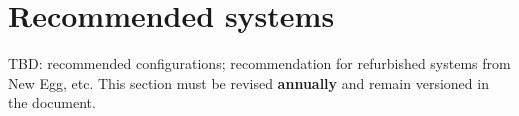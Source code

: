 \section{Recommended systems}

{\color{brown}TBD: recommended configurations; recommendation for refurbished systems from New Egg, etc. This section must be revised \textbf{annually} and remain versioned in the document.}
